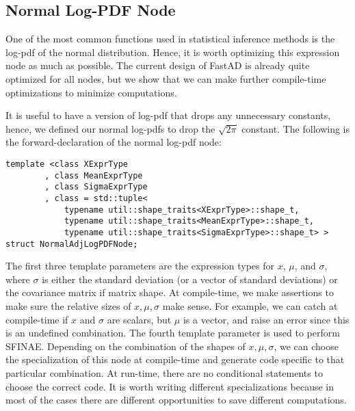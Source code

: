\subsection{Normal Log-PDF Node}\label{ssec:normal_log_pdf}

One of the most common functions used in statistical inference methods
is the log-pdf of the normal distribution.
Hence, it is worth optimizing this expression node as much as possible.
The current design of FastAD is already quite optimized for all nodes,
but we show that we can make further compile-time optimizations to minimize computations.

It is useful to have a version of log-pdf that drops any unnecessary constants,
hence, we defined our normal log-pdfs to drop the $\sqrt{2\pi}$ constant.
The following is the forward-declaration of the normal log-pdf node:
\begin{lstlisting}[style=customcpp]
template <class XExprType
        , class MeanExprType
        , class SigmaExprType
        , class = std::tuple<
            typename util::shape_traits<XExprType>::shape_t,
            typename util::shape_traits<MeanExprType>::shape_t,
            typename util::shape_traits<SigmaExprType>::shape_t> >
struct NormalAdjLogPDFNode;
\end{lstlisting}
The first three template parameters are the expression types for
$x$, $\mu$, and $\sigma$, where $\sigma$ is either the standard deviation
(or a vector of standard deviations) or the covariance matrix if matrix shape.
At compile-time, we make assertions to make sure the relative sizes of
$x, \mu, \sigma$ make sense.
For example, we can catch at compile-time 
if $x$ and $\sigma$ are scalars, but $\mu$ is a vector, and 
raise an error since this is an undefined combination.
The fourth template parameter is used to perform SFINAE.\@
Depending on the combination of the shapes of $x,\mu,\sigma$,
we can choose the specialization of this node at compile-time and 
generate code specific to that particular combination.
At run-time, there are no conditional statements to choose the correct code.
It is worth writing different specializations because in most of the cases
there are different opportunities to save different computations.

